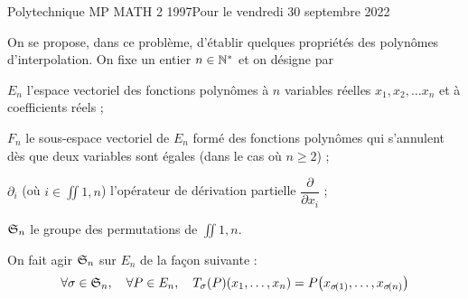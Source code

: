 \documentclass[a4paper,french,bookmarks]{article}
\begin{document}
    \renewcommand{\thesection}{\Roman{section}}
    \renewcommand{\thesection}{Partie \Roman{section}}
    \renewcommand{\labelenumi}{\Roman{section}.\arabic{enumi}.}
    \renewcommand*{\labelenumii}{\alph{enumii}.}

    {Polytechnique MP MATH 2 1997}{Pour le vendredi 30 septembre 2022}

    On se propose, dans ce problème, d'établir quelques propriétés des
    polynômes d'interpolation. On fixe un entier $n \in \mathbb{N}^*$ et on
    désigne par
    \begin{enumerate}
        \itt $E_n$ l'espace vectoriel des fonctions polynômes à $n$
        variables réelles $x_1, x_2, \dots x_n$ et à coefficients
        réels ;

        \itt $F_n$ le sous-espace vectoriel de $E_n$ formé des fonctions
        polynômes qui s'annulent dès que deux variables sont égales (dans
        le cas où $n \geq 2$) ;

        \itt $\partial_i$ (où $i \in \iint{1, n}$) l'opérateur de
        dérivation partielle $\dfrac{\partial}{\partial x_i}$ ;

        \itt $\mathfrak{S}_n$ le groupe des permutations de $\iint{1, n}$.

    \end{enumerate}

    On fait agir $\mathfrak{S}_n$ sur $E_n$ de la façon suivante :
    \[ \forall \sigma \in \mathfrak{S}_n,\quad \forall P \in E_n,\quad T_\sigma
    \!\left(P\right)\!\left(x_1, \dots, x_n\right) = P\!\left(x_{\sigma\!\left(1\right)}, \dots,
        x_{\sigma\!\left(n\right)}\right)\]

    \section{}
\end{document}
